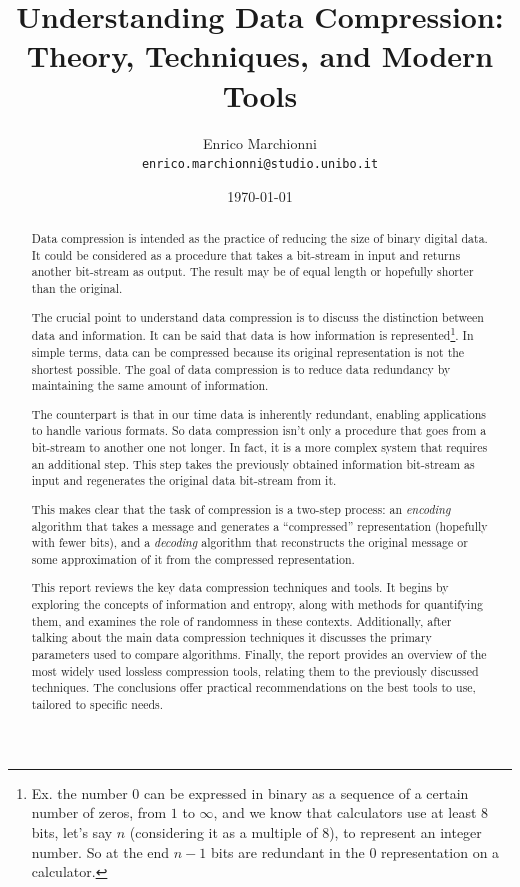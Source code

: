 \documentclass[12pt, a4paper]{report}
\title{
  Understanding Data Compression: Theory, Techniques, and Modern Tools
}
\author{
  Enrico Marchionni\\
  \texttt{enrico.marchionni@studio.unibo.it}
}
\date{\today}
\begin{document}
\maketitle

\begin{abstract}

Data compression is intended as the practice of reducing the size of binary digital data.
It could be considered as a procedure that takes a bit-stream in input and returns another bit-stream as output.
The result may be of equal length or hopefully shorter than the original.

The crucial point to understand data compression is to discuss the distinction between data and information.
It can be said that data is how information is represented\footnote{Ex. the number 0 can be expressed in binary as a sequence of a
certain number of zeros, from \(1\) to \(\infty\), and we know that calculators use at least 8 bits, let's say \(n\)
(considering it as a multiple of 8), to represent an integer number. So at the end \(n - 1\) bits are redundant in the 0
representation on a calculator.}.
In simple terms, data can be compressed because its original representation is not the shortest possible.
The goal of data compression is to reduce data redundancy by maintaining the same amount of information.

The counterpart is that in our time data is inherently redundant, enabling applications to handle various formats.
So data compression isn't only a procedure that goes from a bit-stream to another one not longer.
In fact, it is a more complex system that requires an additional step.
This step takes the previously obtained information bit-stream as input and regenerates the original data bit-stream from it.

This makes clear that the task of compression is a two-step process: an \textit{encoding} algorithm that takes a message
and generates a ``compressed'' representation (hopefully with fewer bits), and a \textit{decoding} algorithm that reconstructs
the original message or some approximation of it from the compressed representation.

This report reviews the key data compression techniques and tools.
It begins by exploring the concepts of information and entropy, along with methods for quantifying them, and examines the role of
randomness in these contexts.
Additionally, after talking about the main data compression techniques it discusses the primary parameters used to compare
algorithms.
Finally, the report provides an overview of the most widely used lossless compression tools, relating them to the previously
discussed techniques.
The conclusions offer practical recommendations on the best tools to use, tailored to specific needs.

\end{abstract}
\end{document}
